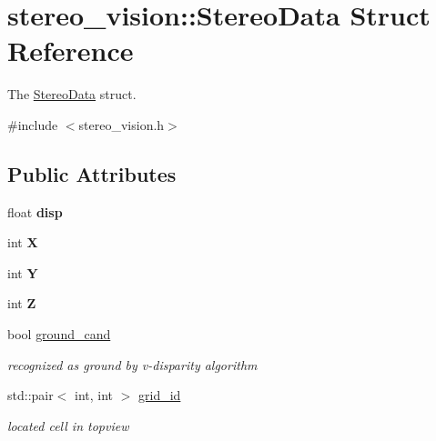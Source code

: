 \hypertarget{structstereo__vision_1_1_stereo_data}{}\section{stereo\+\_\+vision\+:\+:Stereo\+Data Struct Reference}
\label{structstereo__vision_1_1_stereo_data}


The \hyperlink{structstereo__vision_1_1_stereo_data}{Stereo\+Data} struct.  




{\ttfamily \#include $<$stereo\+\_\+vision.\+h$>$}

\subsection*{Public Attributes}
\begin{DoxyCompactItemize}
\item 
\hypertarget{structstereo__vision_1_1_stereo_data_a64a63da05bda0b911b580017907d3cd4}{}float {\bfseries disp}\label{structstereo__vision_1_1_stereo_data_a64a63da05bda0b911b580017907d3cd4}

\item 
\hypertarget{structstereo__vision_1_1_stereo_data_a020c1abf7b53ad7553f05e9a1cbceafc}{}int {\bfseries X}\label{structstereo__vision_1_1_stereo_data_a020c1abf7b53ad7553f05e9a1cbceafc}

\item 
\hypertarget{structstereo__vision_1_1_stereo_data_ae018bd15ad3a913268b3c0be446dcec2}{}int {\bfseries Y}\label{structstereo__vision_1_1_stereo_data_ae018bd15ad3a913268b3c0be446dcec2}

\item 
\hypertarget{structstereo__vision_1_1_stereo_data_a3223806159a7fc90ee6d523c89346bcd}{}int {\bfseries Z}\label{structstereo__vision_1_1_stereo_data_a3223806159a7fc90ee6d523c89346bcd}

\item 
\hypertarget{structstereo__vision_1_1_stereo_data_ac1742b7a708e1cc995fc26e046551272}{}bool \hyperlink{structstereo__vision_1_1_stereo_data_ac1742b7a708e1cc995fc26e046551272}{ground\+\_\+cand}\label{structstereo__vision_1_1_stereo_data_ac1742b7a708e1cc995fc26e046551272}

\begin{DoxyCompactList}\small\item\em recognized as ground by v-\/disparity algorithm \end{DoxyCompactList}\item 
\hypertarget{structstereo__vision_1_1_stereo_data_ad224fb4fb920f605c9ef909b799b8785}{}std\+::pair$<$ int, int $>$ \hyperlink{structstereo__vision_1_1_stereo_data_ad224fb4fb920f605c9ef909b799b8785}{grid\+\_\+id}\label{structstereo__vision_1_1_stereo_data_ad224fb4fb920f605c9ef909b799b8785}

\begin{DoxyCompactList}\small\item\em located cell in topview \end{DoxyCompactList}\end{DoxyCompactItemize}


